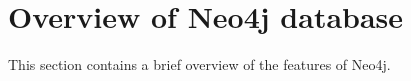 
\section{Overview of Neo4j database}

This section contains a brief overview of the features of Neo4j.

